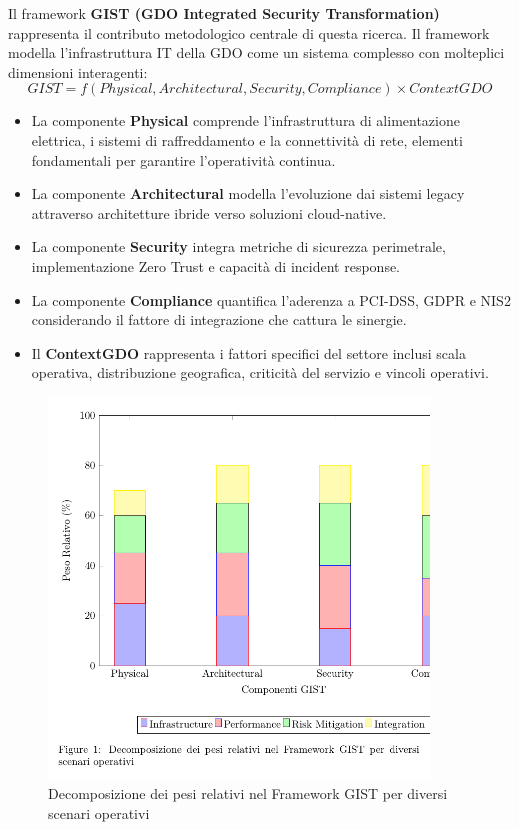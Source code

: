 \documentclass{report}
\begin{document}
Il framework \textbf{GIST (GDO Integrated Security Transformation)} rappresenta il contributo metodologico centrale di questa ricerca. 
Il framework modella l'infrastruttura IT della GDO come un sistema complesso con molteplici dimensioni interagenti:
\begin{equation}
   GIST = f(Physical, Architectural, Security, Compliance) × ContextGDO 
\end{equation}

\begin{itemize}
\item 
La componente \textbf{Physical} comprende l'infrastruttura di alimentazione
elettrica, i sistemi di raffreddamento e la connettività di rete,
elementi fondamentali per garantire l'operatività continua.
\item 
La componente \textbf{Architectural} modella l'evoluzione dai sistemi legacy
attraverso architetture ibride verso soluzioni cloud-native.
\item
La componente \textbf{Security} integra metriche di sicurezza perimetrale, implementazione Zero Trust e capacità di incident response.
\item La componente \textbf{Compliance} quantifica l'aderenza a PCI-DSS, GDPR e NIS2 considerando il fattore di integrazione che cattura le sinergie. 
\item 
Il \textbf{ContextGDO} rappresenta i fattori specifici del settore inclusi scala
operativa, distribuzione geografica, criticità del servizio e vincoli
operativi.
\end{itemize}
\begin{figure}[htbp]
    \centering
    \includegraphics[width=0.9\textwidth]{figura 1-3}
\caption{Decomposizione dei pesi relativi nel Framework GIST per diversi scenari operativi}
\label{fig:gist_decomposition}
\end{figure}
\end{document}
